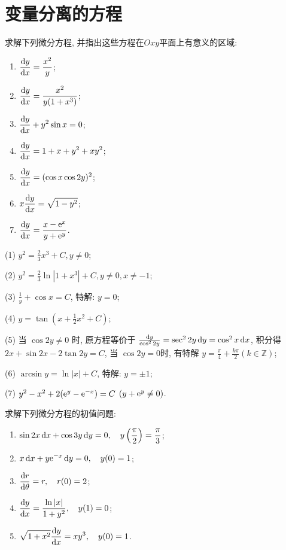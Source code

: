 \section{变量分离的方程}



\begin{exercise}
  求解下列微分方程, 并指出这些方程在$Oxy$平面上有意义的区域:
  \begin{enumerate}[(1)]
  \item $\displaystyle\frac{\mathop{}\!\mathrm{d} y}{\mathop{}\!\mathrm{d} x}=\frac{x^2}{y}$;
  \item $\displaystyle\frac{\mathop{}\!\mathrm{d} y}{\mathop{}\!\mathrm{d} x}=\frac{x^2}{y(1+x^3)}$;
  \item $\displaystyle\frac{\mathop{}\!\mathrm{d} y}{\mathop{}\!\mathrm{d} x}+y^2\sin x=0$;
  \item $\displaystyle\frac{\mathop{}\!\mathrm{d} y}{\mathop{}\!\mathrm{d} x}=1+x+y^2+xy^2$;
  \item $\displaystyle\frac{\mathop{}\!\mathrm{d} y}{\mathop{}\!\mathrm{d} x}=(\cos x\cos 2y)^2$;
  \item $\displaystyle x\frac{\mathop{}\!\mathrm{d} y}{\mathop{}\!\mathrm{d} x}=\sqrt{1-y^2}$;
  \item $\displaystyle\frac{\mathop{}\!\mathrm{d} y}{\mathop{}\!\mathrm{d} x}=\frac{x-\mathrm{e}^x}{y+\mathrm{e}^y}$.
  \end{enumerate}
\end{exercise}

\begin{solve}
  (1) $y^2=\frac{2}{3}x^3+C,y\neq 0$;

  (2) $y^2=\frac{2}{3}\ln|1+x^3|+C,y\neq0,x\neq-1$;

  (3) $\frac{1}{y}+\cos x=C$, 特解: $y=0$;

  (4) $y=\tan(x+\frac{1}{2}x^2+C)$;

  (5) 当 $\cos 2y\neq 0$ 时, 原方程等价于 $\frac{\mathop{}\!\mathrm{d} y}{\cos^2 2y}=\sec^2 2y\mathop{}\!\mathrm{d} y=\cos^2x\mathop{}\!\mathrm{d} x$, 
  积分得 $2x+\sin2x-2\tan2y=C$, 当 $\cos2y=0$时, 有特解 $y=\frac{\pi}{4}+\frac{k\pi}{2}(k\in\mathbb{Z})$;

  (6) $\arcsin y=\ln|x|+C$, 特解: $y=\pm 1$;

  (7) $y^2-x^2+2(\mathrm{e}^y-\mathrm{e}^{-x})=C$ $(y+\mathrm{e}^y\neq 0)$.
\end{solve}



\begin{exercise}
  求解下列微分方程的初值问题:
  \begin{enumerate}[(1)]
  \item $\displaystyle\sin 2x\mathop{}\!\mathrm{d} x+\cos 3y\mathop{}\!\mathrm{d} y=0,\quad y\left(\frac{\pi}{2}\right)=\frac{\pi}{3}$;
  \item $\displaystyle x\mathop{}\!\mathrm{d} x+y\mathrm{e}^{-x}\mathop{}\!\mathrm{d} y=0,\quad y(0)=1$;
  \item $\displaystyle\frac{\mathop{}\!\mathrm{d} r}{\mathop{}\!\mathrm{d}\theta}=r,\quad r(0)=2$;
  \item $\displaystyle\frac{\mathop{}\!\mathrm{d} y}{\mathop{}\!\mathrm{d} x}=\frac{\ln|x|}{1+y^2},\quad y(1)=0$;
  \item $\displaystyle\sqrt{1+x^2}\frac{\mathop{}\!\mathrm{d} y}{\mathop{}\!\mathrm{d} x}=xy^3,\quad y(0)=1$.
  \end{enumerate}
\end{exercise}

